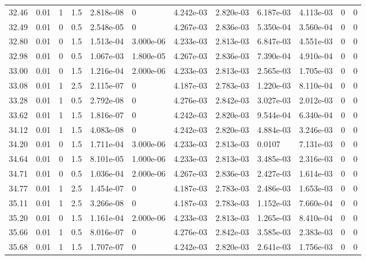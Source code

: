 \documentclass[preview]{standalone}
\begin{document}
{{{{{\begin{tabular}{L{1.2cm}C{1.2cm} C{0.3cm}C{0.5cm} C{1.4cm}C{1.4cm} C{1.4cm}C{1.4cm} C{1.6cm}C{1.6cm} C{1.6cm}C{1.6cm}}
  32.46  &  0.01  & 1     & 1.5 &  2.818e-08  & 0  &  4.242e-03&   2.820e-03& 6.187e-03 & 4.113e-03   &  0 & 0  \\ 
  32.49  &  0.01  & 0     & 0.5 &  2.548e-05  & 0  &  4.267e-03&   2.836e-03& 5.350e-04 & 3.560e-04   &  0 & 0  \\ 
  32.80  &  0.01  & 0     & 1.5 &  1.513e-04  & 3.000e-06  &  4.233e-03&   2.813e-03& 6.847e-03 & 4.551e-03   &  0 & 0  \\ 
  32.98  &  0.01  & 0     & 0.5 &  1.067e-03  & 1.800e-05  &  4.267e-03&   2.836e-03& 7.390e-04 & 4.910e-04   &  0 & 0  \\ 
  33.00  &  0.01  & 0     & 1.5 &  1.216e-04  & 2.000e-06  &  4.233e-03&   2.813e-03& 2.565e-03 & 1.705e-03   &  0 & 0  \\ 
  33.08  &  0.01  & 1     & 2.5 &  2.115e-07  & 0  &  4.187e-03&   2.783e-03& 1.220e-03 & 8.110e-04   &  0 & 0  \\ 
  33.28  &  0.01  & 1     & 0.5 &  2.792e-08  & 0  &  4.276e-03&   2.842e-03& 3.027e-03 & 2.012e-03   &  0 & 0  \\ 
  33.62  &  0.01  & 1     & 1.5 &  1.816e-07  & 0  &  4.242e-03&   2.820e-03& 9.544e-04 & 6.340e-04   &  0 & 0  \\ 
  34.12  &  0.01  & 1     & 1.5 &  4.083e-08  & 0  &  4.242e-03&   2.820e-03& 4.884e-03 & 3.246e-03   &  0 & 0  \\ 
  34.20  &  0.01  & 0     & 1.5 &  1.711e-04  & 3.000e-06  &  4.233e-03&   2.813e-03& 0.0107 & 7.131e-03   &  0 & 0  \\ 
  34.64  &  0.01  & 0     & 1.5 &  8.101e-05  & 1.000e-06  &  4.233e-03&   2.813e-03& 3.485e-03 & 2.316e-03   &  0 & 0  \\ 
  34.71  &  0.01  & 0     & 0.5 &  1.036e-04  & 2.000e-06  &  4.267e-03&   2.836e-03& 2.427e-03 & 1.614e-03   &  0 & 0  \\ 
  34.77  &  0.01  & 1     & 2.5 &  1.454e-07  & 0  &  4.187e-03&   2.783e-03& 2.486e-03 & 1.653e-03   &  0 & 0  \\ 
  35.11  &  0.01  & 1     & 2.5 &  3.266e-08  & 0  &  4.187e-03&   2.783e-03& 1.152e-03 & 7.660e-04   &  0 & 0  \\ 
  35.20  &  0.01  & 0     & 1.5 &  1.161e-04  & 2.000e-06  &  4.233e-03&   2.813e-03& 1.265e-03 & 8.410e-04   &  0 & 0  \\ 
  35.66  &  0.01  & 1     & 0.5 &  8.016e-07  & 0  &  4.276e-03&   2.842e-03& 3.585e-03 & 2.383e-03   &  0 & 0  \\ 
  35.68  &  0.01  & 1     & 1.5 &  1.707e-07  & 0  &  4.242e-03&   2.820e-03& 2.641e-03 & 1.756e-03   &  0 & 0  \\ 

\end{tabular}}}}}}
\end{document}

